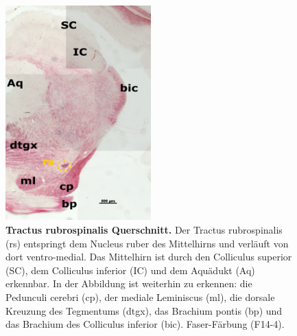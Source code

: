 \documentclass[12pt,a4paper,pdftex]{article}
\begin{document}
\begin{figure}[H]
    \centering
    \includegraphics[width=0.5\textwidth]{pictures/Bilder_Laura/rubrospinal_tract_F14_4P_025x.png}
    \caption[Tractus rubrospinalis Querschnitt]{\textbf{Tractus rubrospinalis Querschnitt.} Der Tractus rubrospinalis (rs) entspringt dem Nucleus ruber des Mittelhirns und verläuft von dort ventro-medial. Das Mittelhirn ist durch den Colliculus superior (SC), dem Colliculus inferior (IC) und dem Aquädukt (Aq) erkennbar. In der Abbildung ist weiterhin zu erkennen: die Pedunculi cerebri (cp), der mediale Leminiscus (ml), die dorsale Kreuzung des Tegmentums (dtgx), das Brachium pontis (bp) und das Brachium des Colliculus inferior (bic). Faser-Färbung (F14-4).}
    \label{fig:rubrospinal_tract}
\end{figure}
\end{document}
